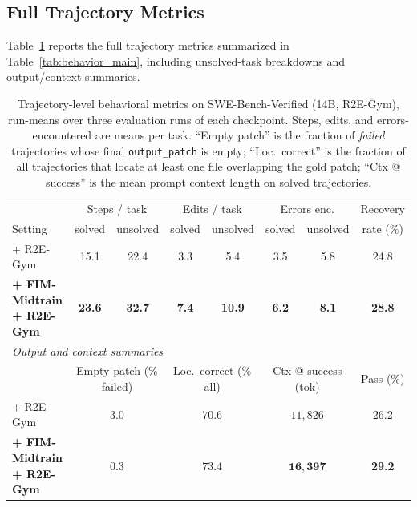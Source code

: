 \subsection{Full Trajectory Metrics}
\label{app:behavior_extra:metrics}

Table~\ref{tab:behavior_full} reports the full trajectory metrics
summarized in Table~\ref{tab:behavior_main}, including unsolved-task
breakdowns and output/context summaries.

\begin{table}[h]
\centering
\caption{Trajectory-level behavioral metrics on SWE-Bench-Verified
(14B, R2E-Gym), run-means over three evaluation runs of each
checkpoint. Steps, edits, and errors-encountered are means per task.
``Empty patch'' is the fraction of \emph{failed} trajectories whose
final \texttt{output\_patch} is empty; ``Loc.\ correct'' is the
fraction of all trajectories that locate at least one file overlapping
the gold patch; ``Ctx @ success'' is the mean prompt context length on
solved trajectories.}
\label{tab:behavior_full}
\small
\setlength{\tabcolsep}{4pt}
\begin{tabular}{l c c c c c c c}
\toprule
& \multicolumn{2}{c}{Steps / task}
& \multicolumn{2}{c}{Edits / task}
& \multicolumn{2}{c}{Errors enc.}
& Recovery \\
\cmidrule(lr){2-3}\cmidrule(lr){4-5}\cmidrule(lr){6-7}
Setting & solved & unsolved & solved & unsolved & solved & unsolved & rate (\%) \\
\midrule
+ R2E-Gym
  & 15.1 & 22.4 & 3.3 & 5.4 & 3.5 & 5.8 & 24.8 \\
\textbf{+ FIM-Midtrain + R2E-Gym}
  & \textbf{23.6} & \textbf{32.7} & \textbf{7.4} & \textbf{10.9}
  & \textbf{6.2} & \textbf{8.1} & \textbf{28.8} \\
\midrule
\multicolumn{8}{l}{\textit{Output and context summaries}} \\
\midrule
& \multicolumn{2}{c}{Empty patch (\% failed)}
& \multicolumn{2}{c}{Loc.\ correct (\% all)}
& \multicolumn{2}{c}{Ctx @ success (tok)}
& Pass (\%) \\
\cmidrule(lr){2-3}\cmidrule(lr){4-5}\cmidrule(lr){6-7}
+ R2E-Gym
  & \multicolumn{2}{c}{$3.0$} & \multicolumn{2}{c}{$70.6$}
  & \multicolumn{2}{c}{$11{,}826$} & 26.2 \\
\textbf{+ FIM-Midtrain + R2E-Gym}
  & \multicolumn{2}{c}{$\mathbf{0.3}$} & \multicolumn{2}{c}{$\mathbf{73.4}$}
  & \multicolumn{2}{c}{$\mathbf{16{,}397}$} & \textbf{29.2} \\
\bottomrule
\end{tabular}
\end{table}

